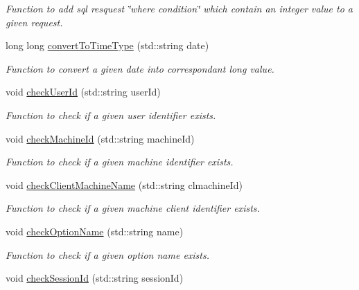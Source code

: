 \begin{DoxyCompactItemize}
\begin{DoxyCompactList}\small\item\em Function to add sql resquest \char`\"{}where condition\char`\"{} which contain an integer value to a given request. \item\end{DoxyCompactList}\item 
long long \hyperlink{classQueryServer_a3b2becf9f1ae6ca1d0097d7400997aa8}{convertToTimeType} (std::string date)
\begin{DoxyCompactList}\small\item\em Function to convert a given date into correspondant long value. \item\end{DoxyCompactList}\item 
void \hyperlink{classQueryServer_a0f5faaf9f4be79361b2eb15e14480a7d}{checkUserId} (std::string userId)
\begin{DoxyCompactList}\small\item\em Function to check if a given user identifier exists. \item\end{DoxyCompactList}\item 
void \hyperlink{classQueryServer_a192112eecd3ec9c706c472d45f82b549}{checkMachineId} (std::string machineId)
\begin{DoxyCompactList}\small\item\em Function to check if a given machine identifier exists. \item\end{DoxyCompactList}\item 
void \hyperlink{classQueryServer_ab05f1d7e54ec0e7bc51772300a7fe9c2}{checkClientMachineName} (std::string clmachineId)
\begin{DoxyCompactList}\small\item\em Function to check if a given machine client identifier exists. \item\end{DoxyCompactList}\item 
void \hyperlink{classQueryServer_addd5852b7271e319daa09c989f23ce83}{checkOptionName} (std::string name)
\begin{DoxyCompactList}\small\item\em Function to check if a given option name exists. \item\end{DoxyCompactList}\item 
void \hyperlink{classQueryServer_aab30c247fe7f71f28ef30d28d78b23e2}{checkSessionId} (std::string sessionId)

\end{DoxyCompactItemize}
